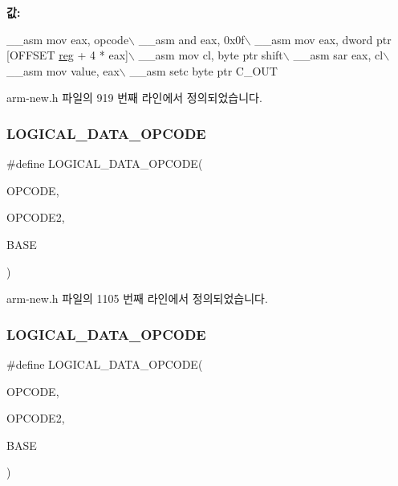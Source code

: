 {\bfseries 값\+:}
\begin{DoxyCode}
\_\_asm mov eax, opcode\(\backslash\)
        \_\_asm and eax, 0x0f\(\backslash\)
        \_\_asm mov eax, dword ptr [OFFSET \mbox{\hyperlink{_g_b_a_8h_ae29faba89509024ffd1a292badcedf2d}{reg}} + 4 * eax]\(\backslash\)
        \_\_asm mov cl, byte ptr shift\(\backslash\)
        \_\_asm sar eax, cl\(\backslash\)
        \_\_asm mov value, eax\(\backslash\)
        \_\_asm setc byte ptr C\_OUT
\end{DoxyCode}


arm-\/new.\+h 파일의 919 번째 라인에서 정의되었습니다.

\mbox{\label{arm-new_8h_a8419e17f23a9a680a1714593e97a0d24}} 
\subsubsection{\texorpdfstring{L\+O\+G\+I\+C\+A\+L\+\_\+\+D\+A\+T\+A\+\_\+\+O\+P\+C\+O\+DE}{LOGICAL\_DATA\_OPCODE}\hspace{0.1cm}{\footnotesize\ttfamily [1/2]}}
{\footnotesize\ttfamily \#define L\+O\+G\+I\+C\+A\+L\+\_\+\+D\+A\+T\+A\+\_\+\+O\+P\+C\+O\+DE(\begin{DoxyParamCaption}\item[{}]{O\+P\+C\+O\+DE,  }\item[{}]{O\+P\+C\+O\+D\+E2,  }\item[{}]{B\+A\+SE }\end{DoxyParamCaption})}



arm-\/new.\+h 파일의 1105 번째 라인에서 정의되었습니다.

\mbox{\label{_g_b_a_8cpp_a8419e17f23a9a680a1714593e97a0d24}} 
\subsubsection{\texorpdfstring{L\+O\+G\+I\+C\+A\+L\+\_\+\+D\+A\+T\+A\+\_\+\+O\+P\+C\+O\+DE}{LOGICAL\_DATA\_OPCODE}\hspace{0.1cm}{\footnotesize\ttfamily [2/2]}}
{\footnotesize\ttfamily \#define L\+O\+G\+I\+C\+A\+L\+\_\+\+D\+A\+T\+A\+\_\+\+O\+P\+C\+O\+DE(\begin{DoxyParamCaption}\item[{}]{O\+P\+C\+O\+DE,  }\item[{}]{O\+P\+C\+O\+D\+E2,  }\item[{}]{B\+A\+SE }\end{DoxyParamCaption})}

